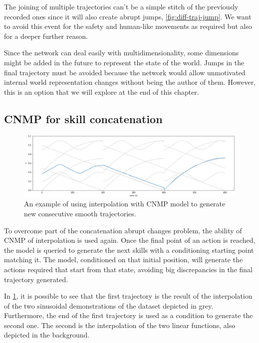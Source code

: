 The joining of multiple trajectories can't be a simple stitch of the previously recorded ones since it will also create abrupt jumps, \cref{fig:diff-traj-jump}. We want to avoid this event for the safety and human-like movements as required but also for a deeper further reason.

Since the network can deal easily with multidimensionality, some dimensions might be added in the future to represent the state of the world. Jumps in the final trajectory must be avoided because the network would allow unmotivated internal world representation changes without being the author of them. However, this is an option that we will explore at the end of this chapter. 

\subsection{CNMP for skill concatenation}
\begin{figure}
    \centering
    \includegraphics[width=0.9\linewidth]{figures/diff-traj-interpolation.png}
    \caption{ An example of using interpolation with CNMP model to generate new consecutive smooth trajectories. }
    \label{fig:diff-traj-interpolation}
\end{figure}

To overcome part of the concatenation abrupt changes problem, the ability of CNMP of interpolation is used again. Once the final point of an action is reached, the model is queried to generate the next skills with a conditioning starting point matching it. The model, conditioned on that initial position, will generate the actions required that start from that state, avoiding big discrepancies in the final trajectory generated. 

In \cref{fig:diff-traj-interpolation}, it is possible to see that the first trajectory is the result of the interpolation of the two sinusoidal demonstrations of the dataset depicted in grey. Furthermore, the end of the first trajectory is used as a condition to generate the second one. The second is the interpolation of the two linear functions, also depicted in the background.

